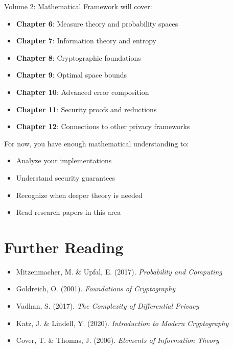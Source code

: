 Volume 2: Mathematical Framework will cover:

\begin{itemize}
\item \textbf{Chapter 6}: Measure theory and probability spaces
\item \textbf{Chapter 7}: Information theory and entropy
\item \textbf{Chapter 8}: Cryptographic foundations
\item \textbf{Chapter 9}: Optimal space bounds
\item \textbf{Chapter 10}: Advanced error composition
\item \textbf{Chapter 11}: Security proofs and reductions
\item \textbf{Chapter 12}: Connections to other privacy frameworks
\end{itemize}

For now, you have enough mathematical understanding to:
\begin{itemize}
\item Analyze your implementations
\item Understand security guarantees
\item Recognize when deeper theory is needed
\item Read research papers in this area
\end{itemize}

\section{Further Reading}

\begin{itemize}
\item Mitzenmacher, M. \& Upfal, E. (2017). \textit{Probability and Computing}
\item Goldreich, O. (2001). \textit{Foundations of Cryptography}
\item Vadhan, S. (2017). \textit{The Complexity of Differential Privacy}
\item Katz, J. \& Lindell, Y. (2020). \textit{Introduction to Modern Cryptography}
\item Cover, T. \& Thomas, J. (2006). \textit{Elements of Information Theory}
\end{itemize}